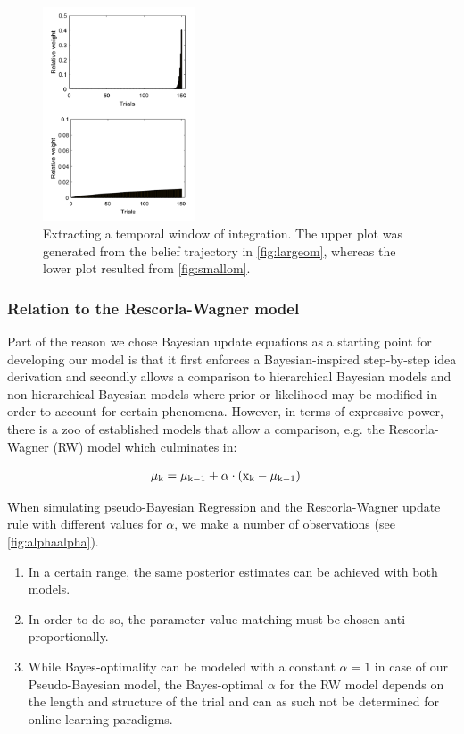 \documentclass{article}
\begin{document}
\begin{multicols}{2}
\begin{figure}[H]
\centering
\includegraphics[width = 0.4\textwidth]{twoi_extracted_crop.png}
\caption{Extracting a temporal window of integration. The upper plot was generated from the belief trajectory in \autoref{fig:largeom}, whereas the lower plot resulted from \autoref{fig:smallom}.
}
\label{fig:twoi}
\end{figure}




\subsubsection*{Relation to the Rescorla-Wagner model}  

Part of the reason we chose Bayesian update equations as a starting point for developing our model is that it first enforces a Bayesian-inspired step-by-step idea derivation and secondly allows a comparison to hierarchical Bayesian models and non-hierarchical Bayesian models where prior or likelihood may be modified in order to account for certain phenomena. However, in terms of expressive power, there is a zoo of established models that allow a comparison, e.g. the Rescorla-Wagner (RW) model which culminates in:

\begin{align}
&\rm \mu_{k} = \mu_{k-1} + \alpha \cdot (x_k-\mu_{k-1}) \label{eq:RW}
\end{align}

When simulating pseudo-Bayesian Regression and the Rescorla-Wagner update rule with different values for $\alpha$, we make a number of observations (see \autoref{fig:alphaalpha}).
\begin{enumerate}
\item In a certain range, the same posterior estimates can be achieved with both models.
\item In order to do so, the parameter value matching must be chosen anti-proportionally.
\item While Bayes-optimality can be modeled with a constant $\alpha = 1$ in case of our Pseudo-Bayesian model, the Bayes-optimal $\alpha$ for the RW model depends on the length and structure of the trial and can as such not be determined for online learning paradigms.
\end{enumerate}



\end{multicols}
\end{document}
